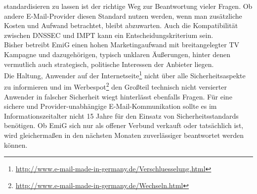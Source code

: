 \documentclass  [paper=a4,
				fontsize=12pt,
				listof=totoc,
				bibliography=totoc
				]{scrreprt}
\begin{document}
			standardisieren zu lassen ist der richtige Weg zur Beantwortung vieler Fragen.
			Ob andere E-Mail-Provider diesen Standard nutzen werden, wenn man zusätzliche Kosten und Aufwand betrachtet, bleibt abzuwarten. Auch die Kompatibilität zwischen DNSSEC und IMPT kann ein Entscheidungskriterium sein.
			\medskip\\
			Bisher betreibt EmiG einen hohen Marketingaufwand mit breitangelegter TV Kampagne und dazugehörigen, typisch unklaren Äußerungen, hinter denen vermutlich auch strategisch, politische Interessen der Anbieter liegen.\\
			Die Haltung, Anwender auf der Internetseite\footnote{\url{http://www.e-mail-made-in-germany.de/Verschluesselung.html}} 
			nicht über alle Sicherheitsaspekte zu informieren und im Werbespot\footnote{\url{http://www.e-mail-made-in-germany.de/Wechseln.html}} den Großteil technisch nicht versierter Anwender in falscher Sicherheit wiegt hinterlässt ebenfalls Fragen.
			Für eine sichere und Provider-unabhängige E-Mail-Kommunikation sollte es im Informationszeitalter nicht 15 Jahre für den Einsatz von Sicherheitsstandards benötigen.
			Ob EmiG sich nur als offener Verbund verkauft oder tatsächlich ist, wird gleichermaßen in den nächsten Monaten zuverlässiger beantwortet werden können.
			
%			
\end{document}
